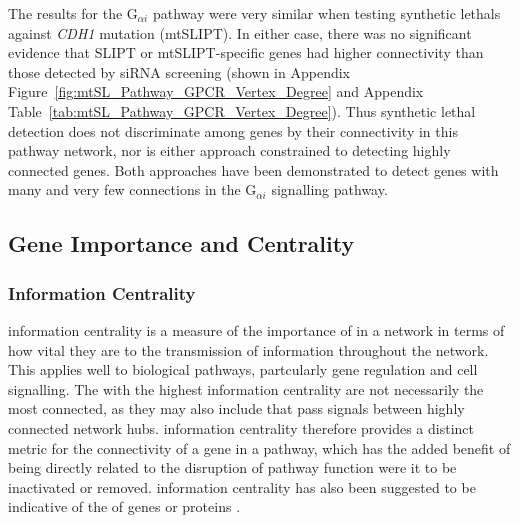 The results for the G$_{\alpha i}$ \gls{pathway} were very similar when testing \glspl{synthetic lethal} against \textit{CDH1} \gls{mutation} (\acrshort{mtSLIPT}). In either case, there was no significant evidence that \gls{SLIPT} or \acrshort{mtSLIPT}-specific genes had higher connectivity than those detected by \gls{siRNA} screening (shown in Appendix Figure~\ref{fig:mtSL_Pathway_GPCR_Vertex_Degree} and Appendix Table~\ref{tab:mtSL_Pathway_GPCR_Vertex_Degree}). Thus \gls{synthetic lethal} detection does not discriminate among genes by their connectivity in this \gls{pathway} network, nor is either approach constrained to detecting highly connected genes. Both approaches have been demonstrated to detect genes with many and very few connections in the G$_{\alpha i}$ signalling \gls{pathway}.

\FloatBarrier

\subsection{Gene Importance and Centrality}  \label{chapt4:Network_Centrality}

\subsubsection{Information Centrality}  \label{chapt4:Network_InfoCent}

\Gls{information centrality} is a measure of the importance of  in a network in terms of how vital they are to the transmission of information throughout the network. This applies well to biological \glspl{pathway}, partcularly gene regulation and cell signalling. The  with the highest \gls{information centrality} are not necessarily the most connected, as they may also include  that pass signals between highly connected network hubs. \Gls{information centrality} therefore provides a distinct metric for the connectivity of a gene in a \gls{pathway}, which has the added benefit of being directly related to the disruption of \gls{pathway} function were it to be inactivated or removed.
%
\Gls{information centrality} has also been suggested to be indicative of the  of genes or proteins \citep{Kranthi2013}.%

